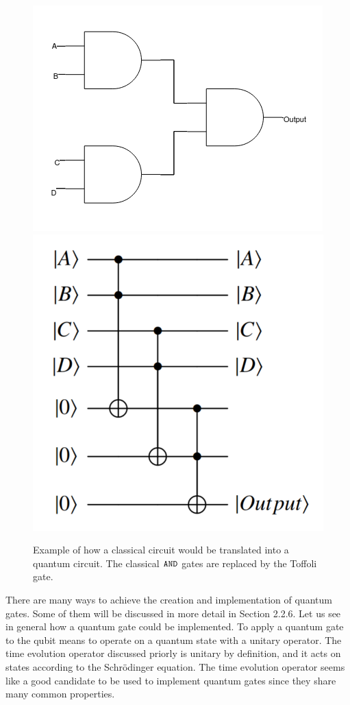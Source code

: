 \begin{figure}[H]
\label{fig:circ}
\begin{center}
\includegraphics[scale=0.5]{figures/Andgates.png}
\includegraphics[scale=0.2]{figures/Qcircuit.png}
\caption{Example of how a classical circuit would be translated into a quantum circuit. The classical ${\tt AND}$ gates are replaced by the Toffoli gate.}
\end{center}
\end{figure}

There are many ways to achieve the creation and implementation of quantum gates. Some of them will be discussed in more detail in Section 2.2.6. Let us see in general how a quantum gate could be implemented. To apply a quantum gate to the qubit means to operate on a quantum state with a unitary operator. The time evolution operator discussed priorly is unitary by definition, and it acts on states according to the Schrödinger equation. The time evolution operator seems like a good candidate to be used to implement quantum gates since they share many common properties.


